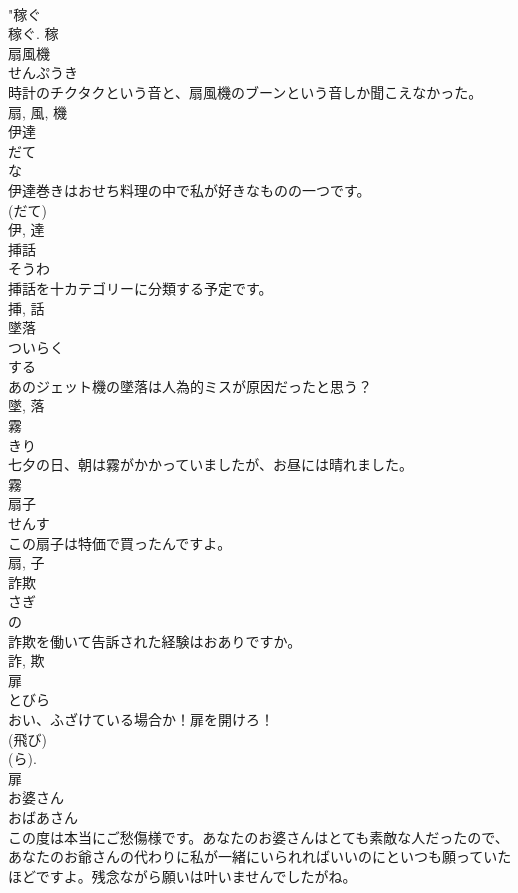 \documentclass[8pt]{extreport}
\begin{document}
\begin{CJK}{UTF8}{min}
\\	"稼ぐ 
\\	稼ぐ.	稼	
\\	扇風機	
\\	せんぷうき	
\\	時計のチクタクという音と、扇風機のブーンという音しか聞こえなかった。	
\\	扇, 風, 機	
\\	伊達	
\\	だて	
\\	な 
\\	伊達巻きはおせち料理の中で私が好きなものの一つです。	
\\	(だて) 
\\	伊, 達	
\\	挿話	
\\	そうわ	
\\	挿話を十カテゴリーに分類する予定です。	
\\	挿, 話	
\\	墜落	
\\	ついらく	
\\	する 
\\	あのジェット機の墜落は人為的ミスが原因だったと思う？	
\\	墜, 落	
\\	霧	
\\	きり	
\\	七夕の日、朝は霧がかかっていましたが、お昼には晴れました。	
\\	霧	
\\	扇子	
\\	せんす	
\\	この扇子は特価で買ったんですよ。	
\\	扇, 子	
\\	詐欺	
\\	さぎ	
\\	の 
\\	詐欺を働いて告訴された経験はおありですか。	
\\	詐, 欺	
\\	扉	
\\	とびら	
\\	おい、ふざけている場合か！扉を開けろ！	
\\	(飛び) 
\\	(ら). 
\\	扉	
\\	お婆さん	
\\	おばあさん	
\\	この度は本当にご愁傷様です。あなたのお婆さんはとても素敵な人だったので、あなたのお爺さんの代わりに私が一緒にいられればいいのにといつも願っていたほどですよ。残念ながら願いは叶いませんでしたがね。	

\end{CJK}
\end{document}
